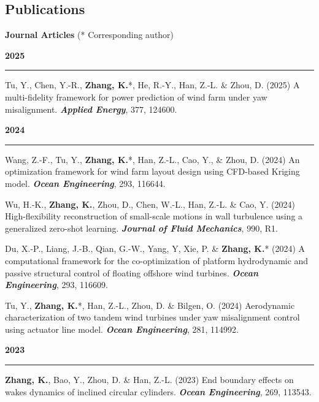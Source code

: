 \documentclass[10pt]{article}
\begin{document}
\subsection*{Publications}
{\bf \color{Blue}Journal Articles} (*  Corresponding author)
{\small
\begin{etaremune}

 
  \item [] {\bf \color{Blue} 2025 \rule{14.8cm}{0.2mm}}
  \item Tu, Y., Chen, Y.-R., \textbf{Zhang, K.}*, He, R.-Y., Han, Z.-L. \& Zhou, D. (2025) A multi-fidelity framework for power prediction of wind farm under yaw misalignment. \textit{\textbf{Applied Energy}}, 377, 124600.

  \item [] {\bf \color{Blue} 2024 \rule{14.8cm}{0.2mm}}  
  \item Wang, Z.-F., Tu, Y., \textbf{Zhang, K.}*, Han, Z.-L., Cao, Y., \& Zhou, D. (2024) An optimization framework for wind farm layout design using CFD-based Kriging model. \textit{\textbf{Ocean Engineering}}, 293, 116644.
  
  \item Wu, H.-K., \textbf{Zhang, K.}, Zhou, D., Chen, W.-L., Han, Z.-L. \& Cao, Y. (2024) High-flexibility reconstruction of small-scale motions in wall turbulence using a generalized zero-shot learning. \textit{\textbf{Journal of Fluid Mechanics}}, 990, R1.
  
  \item Du, X.-P., Liang, J.-B., Qian, G.-W., Yang, Y, Xie, P. \& \textbf{Zhang, K.}* (2024) A computational framework for the co-optimization of platform hydrodynamic and passive structural control of floating offshore wind turbines. \textit{\textbf{Ocean Engineering}}, 293, 116609.
  
 \item Tu, Y., \textbf{Zhang, K.}*, Han, Z.-L., Zhou, D. \& Bilgen, O. (2024) Aerodynamic characterization of two tandem wind turbines under yaw misalignment control using actuator line model. \textit{\textbf{Ocean Engineering}}, 281, 114992.
 
  \item [] {\bf \color{Blue} 2023 \rule{14.8cm}{0.2mm}}
  
 \item \textbf{Zhang, K.}, Bao, Y., Zhou, D. \& Han, Z.-L. (2023) End boundary effects on wakes dynamics of inclined circular cylinders. \textit{\textbf{Ocean Engineering}}, 269, 113543.
 

\end{etaremune}}
\end{document}
